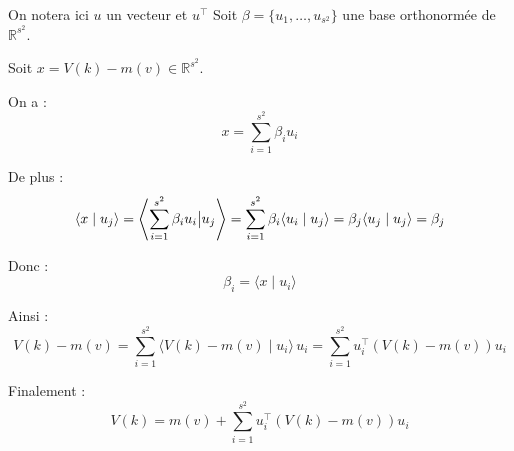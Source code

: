 On notera ici \(u\) un vecteur et \(u^{\top}\)
Soit \(\beta = \{u_{1}, \ldots, u_{s^{2}}\}\) une base orthonormée de \(\mathbb{R}^{s^{2}}\).

Soit \(x = V(k) - m(v) \in \mathbb{R}^{s^{2}}\).

On a :
\[
x = \sum_{i=1}^{s^{2}} \beta_{i} u_{i}
\]

De plus :
\[
\langle x \mid u_{j} \rangle = \left\langle \sum_{i=1}^{s^{2}} \beta_{i} u_{i} \big{|} u_{j} \right\rangle = \sum_{i=1}^{s^{2}} \beta_{i} \langle u_{i} \mid u_{j} \rangle = \beta_{j} \langle u_{j} \mid u_{j} \rangle = \beta_{j}
\]

Donc :
\[
\beta_{i} = \langle x \mid u_{i} \rangle
\]

Ainsi :
\[
V(k) - m(v) = \sum_{i=1}^{s^{2}} \langle V(k) - m(v) \mid u_{i} \rangle \, u_{i} = \sum_{i=1}^{s^{2}} u_{i}^{\top} \left( V(k) - m(v) \right) u_{i}
\]

Finalement :
\[
V(k) = m(v) + \sum_{i=1}^{s^{2}} u_{i}^{\top} \left( V(k) - m(v) \right) u_{i}
\]